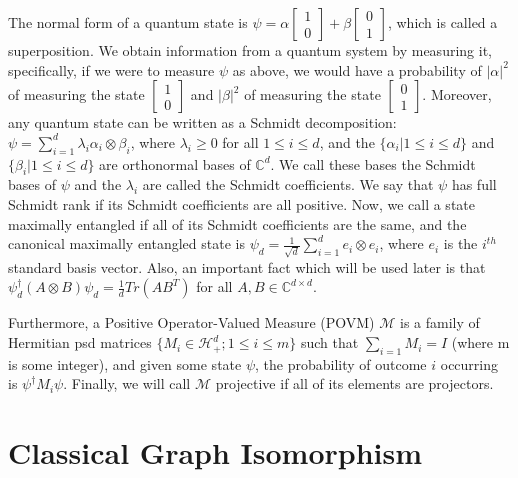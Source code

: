 \documentclass[12pt]{article}
\begin{document}
The normal form of a quantum state is $\psi = \alpha \begin{bmatrix}
1 \\
0 
\end{bmatrix}
+ \beta
\begin{bmatrix}
0 \\
1
\end{bmatrix}
$, which is called a superposition. We obtain information from a
quantum system by measuring it, specifically, if we were to measure
$\psi$ as above, we would have a probability of $|\alpha|^2$ of
measuring the state $\begin{bmatrix} 1 \\ 0
\end{bmatrix}$ and $|\beta|^2$ of measuring the state $\begin{bmatrix}
0 \\
1 
\end{bmatrix}$. Moreover, any quantum state can be written as a
Schmidt decomposition: $\psi = \sum_{i=1}^d \lambda_i \alpha_i \otimes
\beta_i$, where $\lambda_i \geq 0$ for all $1 \leq i \leq d$, and the
$\{\alpha_i| 1 \leq i \leq d\}$ and $\{\beta_i| 1 \leq i \leq d\}$ are
orthonormal bases of $\mathbb{C}^d$. We call these bases the Schmidt
bases of $\psi$ and the $\lambda_i$ are called the Schmidt
coefficients. We say that $\psi$ has full Schmidt rank if its Schmidt
coefficients are all positive. Now, we call a state maximally
entangled if all of its Schmidt coefficients are the same, and the
canonical maximally entangled state is $\psi_d = \frac{1}{\sqrt{d}}
\sum_{i=1}^d e_i \otimes e_i$, where $e_i$ is the $i^{th}$ standard
basis vector. Also, an important fact which will be used later is that
$\psi^{\dag}_d (A \otimes B) \psi_d = \frac{1}{d} Tr(AB^T)$ for all
$A, B \in \mathbb{C}^{d \times d}$.

Furthermore, a Positive Operator-Valued Measure (POVM) $\mathcal{M}$
is a family of Hermitian psd matrices $\{ M_i \in \mathcal{H}^d_+; 1
\leq i \leq m \}$ such that $\sum_{i=1}M_i = I$ (where m is some
integer), and given some state $\psi$, the probability of outcome $i$
occurring is $\psi^\dag M_i \psi$. Finally, we will call $\mathcal{M}$
projective if all of its elements are projectors.

\section{Classical Graph Isomorphism}
\label{sec:ciso}
\end{document}
